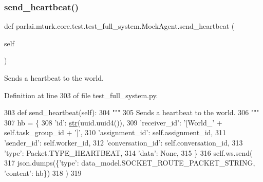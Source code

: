 \subsubsection{\texorpdfstring{send\+\_\+heartbeat()}{send\_heartbeat()}}
{\footnotesize\ttfamily def parlai.\+mturk.\+core.\+test.\+test\+\_\+full\+\_\+system.\+Mock\+Agent.\+send\+\_\+heartbeat (\begin{DoxyParamCaption}\item[{}]{self }\end{DoxyParamCaption})}

\begin{DoxyVerb}Sends a heartbeat to the world.
\end{DoxyVerb}
 

Definition at line 303 of file test\+\_\+full\+\_\+system.\+py.


\begin{DoxyCode}
303     \textcolor{keyword}{def }send\_heartbeat(self):
304         \textcolor{stringliteral}{"""}
305 \textcolor{stringliteral}{        Sends a heartbeat to the world.}
306 \textcolor{stringliteral}{        """}
307         hb = \{
308             \textcolor{stringliteral}{'id'}: \hyperlink{namespacegenerate__task__READMEs_a5b88452ffb87b78c8c85ececebafc09f}{str}(uuid.uuid4()),
309             \textcolor{stringliteral}{'receiver\_id'}: \textcolor{stringliteral}{'[World\_'} + self.task\_group\_id + \textcolor{stringliteral}{']'},
310             \textcolor{stringliteral}{'assignment\_id'}: self.assignment\_id,
311             \textcolor{stringliteral}{'sender\_id'}: self.worker\_id,
312             \textcolor{stringliteral}{'conversation\_id'}: self.conversation\_id,
313             \textcolor{stringliteral}{'type'}: Packet.TYPE\_HEARTBEAT,
314             \textcolor{stringliteral}{'data'}: \textcolor{keywordtype}{None},
315         \}
316         self.ws.send(
317             json.dumps(\{\textcolor{stringliteral}{'type'}: data\_model.SOCKET\_ROUTE\_PACKET\_STRING, \textcolor{stringliteral}{'content'}: hb\})
318         )
319 
\end{DoxyCode}
\mbox{\label{classparlai_1_1mturk_1_1core_1_1test_1_1test__full__system_1_1MockAgent_a6eaaac34d4b7644c88bab53eeb12ebb1}} 
